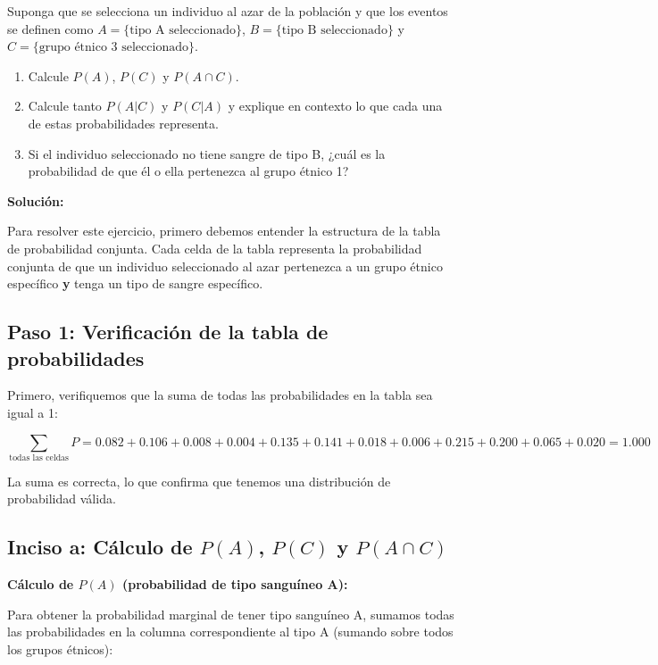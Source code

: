 \documentclass[a4paper]{article}
\begin{document}
Suponga que se selecciona un individuo al azar de la población y que los eventos se definen como $A = \{\text{tipo A seleccionado}\}$, $B = \{\text{tipo B seleccionado}\}$ y $C = \{\text{grupo étnico 3 seleccionado}\}$.

\begin{enumerate}
    \item[\textbf{a.}] Calcule $P(A)$, $P(C)$ y $P(A \cap C)$.
    \item[\textbf{b.}] Calcule tanto $P(A|C)$ y $P(C|A)$ y explique en contexto lo que cada una de estas probabilidades representa.
    \item[\textbf{c.}] Si el individuo seleccionado no tiene sangre de tipo B, ¿cuál es la probabilidad de que él o ella pertenezca al grupo étnico 1?
\end{enumerate}

\vspace{0.5cm}

\textbf{Solución:}

Para resolver este ejercicio, primero debemos entender la estructura de la tabla de probabilidad conjunta. Cada celda de la tabla representa la probabilidad conjunta de que un individuo seleccionado al azar pertenezca a un grupo étnico específico \textbf{y} tenga un tipo de sangre específico.

\subsection*{Paso 1: Verificación de la tabla de probabilidades}

Primero, verifiquemos que la suma de todas las probabilidades en la tabla sea igual a 1:

$$\sum_{\text{todas las celdas}} P = 0.082 + 0.106 + 0.008 + 0.004 + 0.135 + 0.141 + 0.018 + 0.006 + 0.215 + 0.200 + 0.065 + 0.020 = 1.000$$

La suma es correcta, lo que confirma que tenemos una distribución de probabilidad válida.

\subsection*{Inciso a: Cálculo de $P(A)$, $P(C)$ y $P(A \cap C)$}

\textbf{Cálculo de $P(A)$ (probabilidad de tipo sanguíneo A):}

Para obtener la probabilidad marginal de tener tipo sanguíneo A, sumamos todas las probabilidades en la columna correspondiente al tipo A (sumando sobre todos los grupos étnicos):
\end{document}
